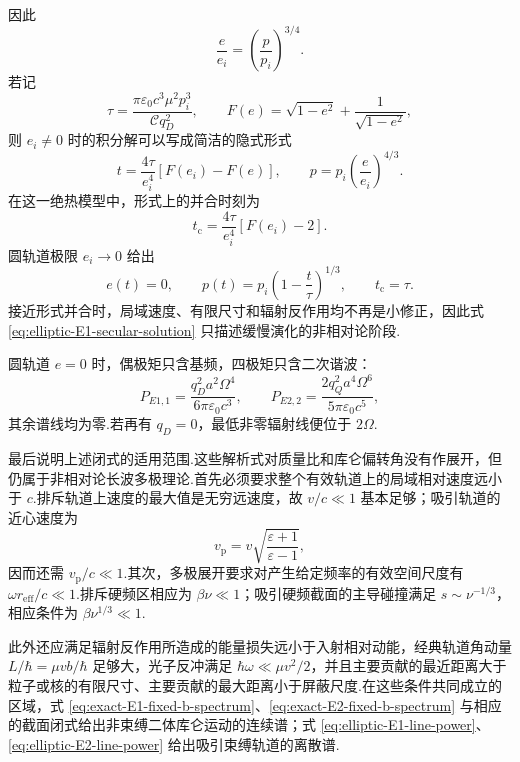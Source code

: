 因此
\begin{equation}
 \frac{e}{e_i}=\left(\frac{p}{p_i}\right)^{3/4}.
 \label{eq:elliptic-e-p-relation}
\end{equation}
若记
\begin{equation}
 \tau=\frac{\pi\varepsilon_0c^3\mu^2p_i^3}{\mathcal Cq_D^2},
 \qquad
 F(e)=\sqrt{1-e^2}+\frac{1}{\sqrt{1-e^2}},
\end{equation}
则 $e_i\neq0$ 时的积分解可以写成简洁的隐式形式
\begin{equation}
 t=\frac{4\tau}{e_i^4}\left[F(e_i)-F(e)\right],
 \qquad
 p=p_i\left(\frac{e}{e_i}\right)^{4/3}.
 \label{eq:elliptic-E1-secular-solution}
\end{equation}
在这一绝热模型中，形式上的并合时刻为
\begin{equation}
 t_{\mathrm c}
 =\frac{4\tau}{e_i^4}\left[F(e_i)-2\right].
\end{equation}
圆轨道极限 $e_i\to0$ 给出
\begin{equation}
 e(t)=0,
 \qquad
 p(t)=p_i\left(1-\frac{t}{\tau}\right)^{1/3},
 \qquad
 t_{\mathrm c}=\tau.
 \label{eq:circular-E1-secular-decay}
\end{equation}
接近形式并合时，局域速度、有限尺寸和辐射反作用均不再是小修正，因此式 \eqref{eq:elliptic-E1-secular-solution} 只描述缓慢演化的非相对论阶段.

圆轨道 $e=0$ 时，偶极矩只含基频，四极矩只含二次谐波：
\begin{equation}
 P_{E1,1}=\frac{q_D^2a^2\Omega^4}{6\pi\varepsilon_0c^3},
 \qquad
 P_{E2,2}=\frac{2q_Q^2a^4\Omega^6}{5\pi\varepsilon_0c^5},
\end{equation}
其余谱线均为零.若再有 $q_D=0$，最低非零辐射线便位于 $2\Omega$.

最后说明上述闭式的适用范围.这些解析式对质量比和库仑偏转角没有作展开，但仍属于非相对论长波多极理论.首先必须要求整个有效轨道上的局域相对速度远小于 $c$.排斥轨道上速度的最大值是无穷远速度，故 $v/c\ll1$ 基本足够；吸引轨道的近心速度为
\begin{equation}
 v_{\mathrm p}=v\sqrt{\frac{\varepsilon+1}{\varepsilon-1}},
\end{equation}
因而还需 $v_{\mathrm p}/c\ll1$.其次，多极展开要求对产生给定频率的有效空间尺度有 $\omega r_{\mathrm{eff}}/c\ll1$.排斥硬频区相应为 $\beta\nu\ll1$；吸引硬频截面的主导碰撞满足 $s\sim\nu^{-1/3}$，相应条件为 $\beta\nu^{1/3}\ll1$.

此外还应满足辐射反作用所造成的能量损失远小于入射相对动能，经典轨道角动量 $L/\hbar=\mu vb/\hbar$ 足够大，光子反冲满足 $\hbar\omega\ll\mu v^2/2$，并且主要贡献的最近距离大于粒子或核的有限尺寸、主要贡献的最大距离小于屏蔽尺度.在这些条件共同成立的区域，式 \eqref{eq:exact-E1-fixed-b-spectrum}、\eqref{eq:exact-E2-fixed-b-spectrum} 与相应的截面闭式给出非束缚二体库仑运动的连续谱；式 \eqref{eq:elliptic-E1-line-power}、\eqref{eq:elliptic-E2-line-power} 给出吸引束缚轨道的离散谱.



